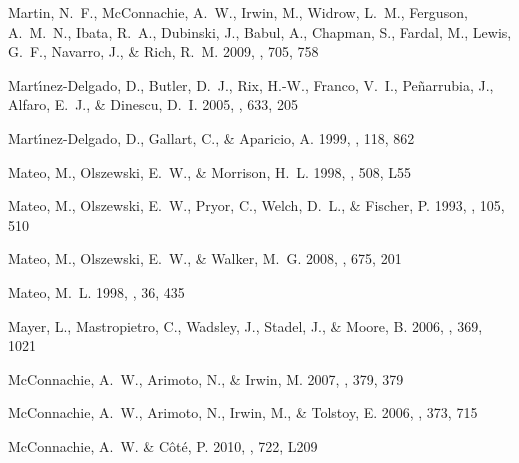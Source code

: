 \documentclass[manuscript]{aastex}
\begin{document}
\begin{thebibliography}{381}
{Martin}, N.~F., {McConnachie}, A.~W., {Irwin}, M., {Widrow}, L.~M.,
  {Ferguson}, A.~M.~N., {Ibata}, R.~A., {Dubinski}, J., {Babul}, A., {Chapman},
  S., {Fardal}, M., {Lewis}, G.~F., {Navarro}, J., \& {Rich}, R.~M. 2009, \apj,
  705, 758

{Mart{\'{\i}}nez-Delgado}, D., {Butler}, D.~J., {Rix}, H.-W., {Franco}, V.~I.,
  {Pe{\~n}arrubia}, J., {Alfaro}, E.~J., \& {Dinescu}, D.~I. 2005, \apj, 633,
  205

{Mart{\'{\i}}nez-Delgado}, D., {Gallart}, C., \& {Aparicio}, A. 1999, \aj, 118,
  862

{Mateo}, M., {Olszewski}, E.~W., \& {Morrison}, H.~L. 1998, \apjl, 508, L55

{Mateo}, M., {Olszewski}, E.~W., {Pryor}, C., {Welch}, D.~L., \& {Fischer}, P.
  1993, \aj, 105, 510

{Mateo}, M., {Olszewski}, E.~W., \& {Walker}, M.~G. 2008, \apj, 675, 201

{Mateo}, M.~L. 1998, \araa, 36, 435

{Mayer}, L., {Mastropietro}, C., {Wadsley}, J., {Stadel}, J., \& {Moore}, B.
  2006, \mnras, 369, 1021

{McConnachie}, A.~W., {Arimoto}, N., \& {Irwin}, M. 2007, \mnras, 379, 379

{McConnachie}, A.~W., {Arimoto}, N., {Irwin}, M., \& {Tolstoy}, E. 2006,
  \mnras, 373, 715

{McConnachie}, A.~W. \& {C{\^o}t{\'e}}, P. 2010, \apjl, 722, L209


\end{thebibliography}
\end{document}
